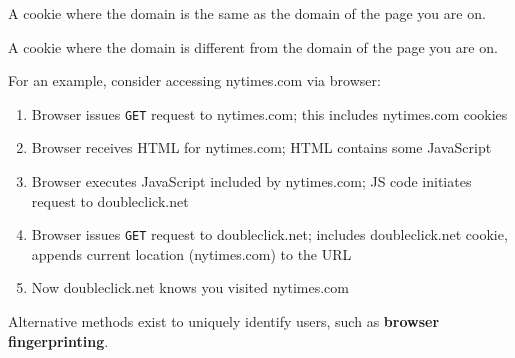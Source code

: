 \begin{definition}
	A cookie where the domain is the same as the domain of the page you are on.
\end{definition}

\begin{definition}
	A cookie where the domain is different from the domain of the page you are on.
\end{definition}

For an example, consider accessing nytimes.com via browser:
\begin{enumerate}[label=\roman*.]
	\item Browser issues \texttt{GET} request to nytimes.com; this includes nytimes.com cookies
	\item Browser receives HTML for nytimes.com; HTML contains some JavaScript
	\item Browser executes JavaScript included by nytimes.com; JS code initiates request to doubleclick.net
	\item Browser issues \texttt{GET} request to doubleclick.net; includes doubleclick.net cookie, appends current location (nytimes.com) to the URL
	\item Now doubleclick.net knows you visited nytimes.com
\end{enumerate}

Alternative methods exist to uniquely identify users, such as \textbf{browser fingerprinting}. 